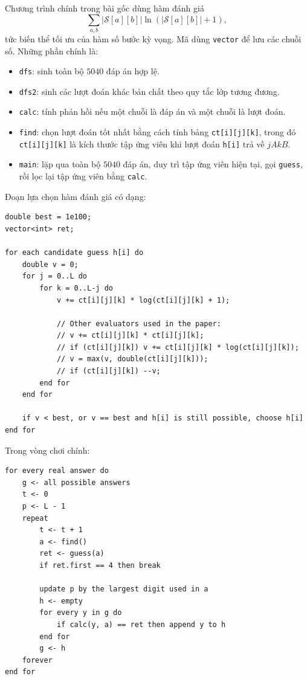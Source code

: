 \documentclass[11pt]{article}
\newcommand{\SetS}{\mathcal{S}}
\begin{document}
Chương trình chính trong bài gốc dùng hàm đánh giá
\[
  \sum_{a,b} |\SetS[a][b]|\ln(|\SetS[a][b]|+1),
\]
tức biến thể tối ưu của hàm số bước kỳ vọng. Mã dùng \texttt{vector} để lưu
các chuỗi số. Những phần chính là:
\begin{itemize}
  \item \texttt{dfs}: sinh toàn bộ \(5040\) đáp án hợp lệ.
  \item \texttt{dfs2}: sinh các lượt đoán khác bản chất theo quy tắc lớp
  tương đương.
  \item \texttt{calc}: tính phản hồi nếu một chuỗi là đáp án và một chuỗi là
  lượt đoán.
  \item \texttt{find}: chọn lượt đoán tốt nhất bằng cách tính bảng
  \texttt{ct[i][j][k]}, trong đó \texttt{ct[i][j][k]} là kích thước tập ứng
  viên khi lượt đoán \texttt{h[i]} trả về \(jAkB\).
  \item \texttt{main}: lặp qua toàn bộ \(5040\) đáp án, duy trì tập ứng viên
  hiện tại, gọi \texttt{guess}, rồi lọc lại tập ứng viên bằng \texttt{calc}.
\end{itemize}

Đoạn lựa chọn hàm đánh giá có dạng:
\begin{verbatim}
double best = 1e100;
vector<int> ret;

for each candidate guess h[i] do
    double v = 0;
    for j = 0..L do
        for k = 0..L-j do
            v += ct[i][j][k] * log(ct[i][j][k] + 1);

            // Other evaluators used in the paper:
            // v += ct[i][j][k] * ct[i][j][k];
            // if (ct[i][j][k]) v += ct[i][j][k] * log(ct[i][j][k]);
            // v = max(v, double(ct[i][j][k]));
            // if (ct[i][j][k]) --v;
        end for
    end for

    if v < best, or v == best and h[i] is still possible, choose h[i]
end for
\end{verbatim}

Trong vòng chơi chính:
\begin{verbatim}
for every real answer do
    g <- all possible answers
    t <- 0
    p <- L - 1
    repeat
        t <- t + 1
        a <- find()
        ret <- guess(a)
        if ret.first == 4 then break

        update p by the largest digit used in a
        h <- empty
        for every y in g do
            if calc(y, a) == ret then append y to h
        end for
        g <- h
    forever
end for
\end{verbatim}
\end{document}
